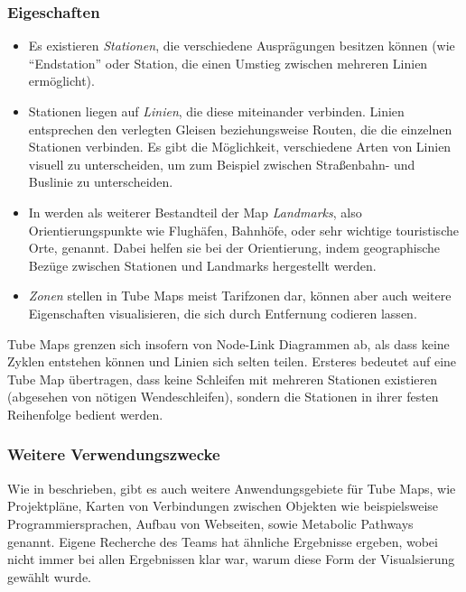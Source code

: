 \subsubsection{Eigeschaften}
\begin{itemize}
\item Es existieren \emph{Stationen}, die verschiedene Ausprägungen besitzen können (wie "`Endstation"' oder Station, die einen Umstieg zwischen mehreren Linien ermöglicht). 
\item Stationen liegen auf \emph{Linien}, die diese miteinander verbinden. Linien entsprechen den verlegten Gleisen beziehungsweise Routen, die die einzelnen Stationen verbinden. Es gibt die Möglichkeit, verschiedene Arten von Linien visuell zu unterscheiden, um zum Beispiel zwischen Straßenbahn- und Buslinie zu unterscheiden.
\item In \cite{automaticlayoutmetro08} werden als weiterer Bestandteil der Map \emph{Landmarks}, also Orientierungspunkte wie Flughäfen, Bahnhöfe, oder sehr wichtige touristische Orte, genannt. Dabei helfen sie bei der Orientierung, indem geographische Bezüge zwischen Stationen und Landmarks hergestellt werden.
\item \emph{Zonen} stellen in Tube Maps meist Tarifzonen dar, können aber auch weitere Eigenschaften visualisieren, die sich durch Entfernung codieren lassen. 
\end{itemize}
Tube Maps grenzen sich insofern von Node-Link Diagrammen ab, als dass keine Zyklen entstehen können und Linien sich selten teilen. Ersteres bedeutet auf eine Tube Map übertragen, dass keine Schleifen mit mehreren Stationen existieren (abgesehen von nötigen Wendeschleifen), sondern die Stationen in ihrer festen Reihenfolge bedient werden. 

\subsubsection{Weitere Verwendungszwecke}
\label{tm:verwendungszwecke}
Wie in \cite{automaticlayoutmetro08} beschrieben, gibt es auch weitere Anwendungsgebiete für Tube Maps, wie Projektpläne, Karten von Verbindungen zwischen Objekten wie beispielsweise Programmiersprachen, Aufbau von Webseiten, sowie Metabolic Pathways genannt. Eigene Recherche des Teams hat ähnliche Ergebnisse ergeben, wobei nicht immer bei allen Ergebnissen klar war, warum diese Form der Visualsierung gewählt wurde. 

